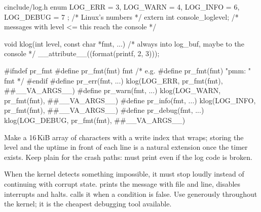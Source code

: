 \documentclass[11pt,a4paper]{article}
\begin{document}
\begin{lst}{c}{include/log.h}
enum { LOG_ERR = 3, LOG_WARN = 4, LOG_INFO = 6, LOG_DEBUG = 7 };    /* Linux's numbers */
extern int console_loglevel;            /* messages with level <= this reach the console */

void klog(int level, const char *fmt, ...)    /* always into log_buf, maybe to the console */
    __attribute__((format(printf, 2, 3)));

#ifndef pr_fmt
#define pr_fmt(fmt) fmt                 /* e.g. #define pr_fmt(fmt) "pmm: " fmt */
#endif
#define pr_err(fmt, ...)   klog(LOG_ERR,   pr_fmt(fmt), ##__VA_ARGS__)
#define pr_warn(fmt, ...)  klog(LOG_WARN,  pr_fmt(fmt), ##__VA_ARGS__)
#define pr_info(fmt, ...)  klog(LOG_INFO,  pr_fmt(fmt), ##__VA_ARGS__)
#define pr_debug(fmt, ...) klog(LOG_DEBUG, pr_fmt(fmt), ##__VA_ARGS__)
\end{lst}
Make  a 16\,KiB array of characters with a write index that wraps; storing the level and the uptime in
front of each line is a natural extension once the timer exists. Keep plain  for the crash paths: 
must print even if the log code is broken.

When the kernel detects something impossible, it must stop loudly instead of continuing with corrupt state.
 prints the message with file and line, disables interrupts and halts.  calls it when a
condition is false. Use  generously throughout the kernel; it is the cheapest debugging tool available.

\end{document}
